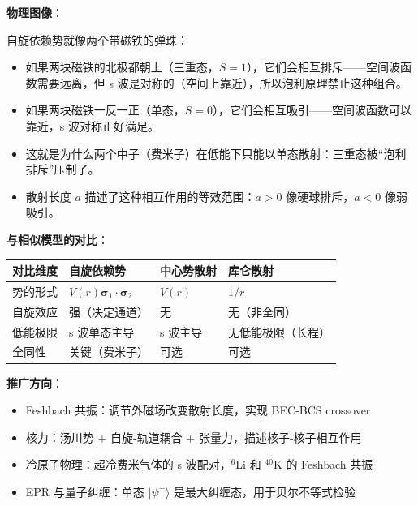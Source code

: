 \begin{insightbox}[物理图像与模型关联]
\textbf{物理图像}：

自旋依赖势就像两个带磁铁的弹珠：
\begin{itemize}[nosep]
    \item 如果两块磁铁的北极都朝上（三重态，$S=1$），它们会相互排斥——空间波函数需要远离，但 s 波是对称的（空间上靠近），所以泡利原理禁止这种组合。
    \item 如果两块磁铁一反一正（单态，$S=0$），它们会相互吸引——空间波函数可以靠近，s 波对称正好满足。
    \item 这就是为什么两个中子（费米子）在低能下只能以单态散射：三重态被``泡利排斥''压制了。
    \item 散射长度 $a$ 描述了这种相互作用的等效范围：$a>0$ 像硬球排斥，$a<0$ 像弱吸引。
\end{itemize}

\textbf{与相似模型的对比}：
\begin{center}
\begin{tabular}{llll}
\toprule
\textbf{对比维度} & \textbf{自旋依赖势} & \textbf{中心势散射} & \textbf{库仑散射} \\
\midrule
势的形式 & $V(r)\boldsymbol{\sigma}_1\cdot\boldsymbol{\sigma}_2$ & $V(r)$ & $1/r$ \\
自旋效应 & 强（决定通道） & 无 & 无（非全同） \\
低能极限 & s 波单态主导 & s 波主导 & 无低能极限（长程） \\
全同性 & 关键（费米子） & 可选 & 可选 \\
\bottomrule
\end{tabular}
\end{center}

\textbf{推广方向}：
\begin{itemize}[nosep]
    \item Feshbach 共振：调节外磁场改变散射长度，实现 BEC-BCS  crossover
    \item 核力：汤川势 + 自旋-轨道耦合 + 张量力，描述核子-核子相互作用
    \item 冷原子物理：超冷费米气体的 s 波配对，$^6$Li 和 $^{40}$K 的 Feshbach 共振
    \item EPR 与量子纠缠：单态 $|\psi^-\rangle$ 是最大纠缠态，用于贝尔不等式检验
\end{itemize}
\end{insightbox}


